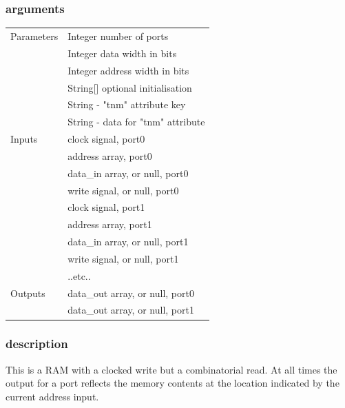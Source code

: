             \subsubsection{arguments}
            
                \begin{tabular}{| l | l |}
                \hline
                Parameters  & Integer number of ports \\
                            & Integer data width in bits \\
                            & Integer address width in bits \\
                            & String[] optional initialisation \\
                            & String - "tnm" attribute key \\
                            & String - data for "tnm" attribute \\
                \hline
                Inputs      & clock signal, port0 \\
                            & address array, port0 \\
                            & data\_in array, or null, port0 \\
                            & write signal, or null, port0 \\
                            & clock signal, port1 \\
                            & address array, port1 \\
                            & data\_in array, or null, port1 \\
                            & write signal, or null, port1 \\
                            & ..etc.. \\
                \hline
                Outputs     & data\_out array, or null, port0 \\
                            & data\_out array, or null, port1 \\
                \hline
                \end{tabular}

            \subsubsection{description}

                This is a RAM with a clocked write but a combinatorial read. At
                all times the output for a port reflects the memory contents at
                the location indicated by the current address input.

